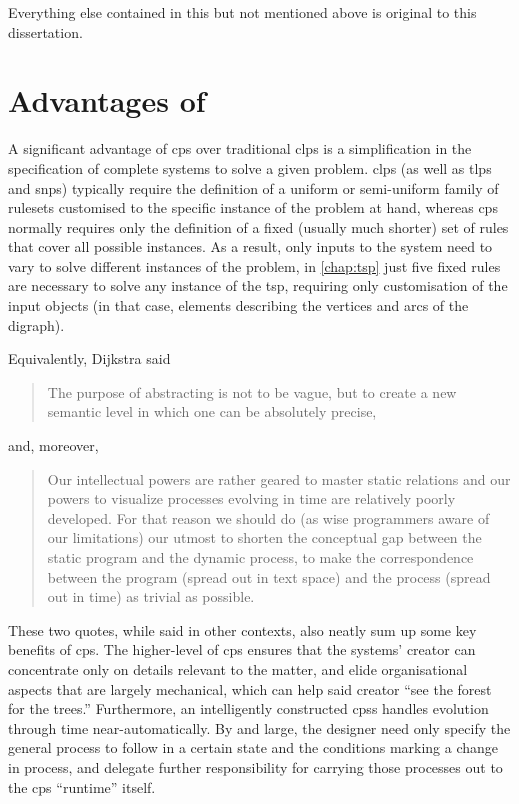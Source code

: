 Everything else contained in this  but not mentioned above is original to this dissertation.


\section{Advantages of }
A significant advantage of \gls{cps} over traditional \gls{clps} is a simplification in the specification of complete systems to solve a given problem.  \Gls{clps} (as well as \gls{tlps} and \gls{snps}) typically require the definition of a uniform or semi-uniform family of \glspl{ruleset} customised to the specific instance of the problem at hand, whereas \gls{cps} normally requires only the definition of a fixed (usually much shorter) set of rules that cover all possible instances. As a result, only inputs to the system need to vary to solve different instances of the problem, \eg{} in \cref{chap:tsp} just five fixed rules are necessary to solve any instance of the \gls{tsp}, requiring only customisation of the input objects (in that case, elements describing the vertices and arcs of the digraph).

Equivalently, Dijkstra \cite{DijkstraWikiquote} said \blockquote{The purpose of abstracting is not to be vague, but to create a new semantic level in which one can be absolutely precise,} and, moreover, \blockquote{Our intellectual powers are rather geared to master static relations and \textelp{} our powers to visualize processes evolving in time are relatively poorly developed. For that reason we should do (as wise programmers aware of our limitations) our utmost to shorten the conceptual gap between the static program and the dynamic process, to make the correspondence between the program (spread out in text space) and the process (spread out in time) as trivial as possible.}.  These two quotes, while said in other contexts, also neatly sum up some key benefits of \gls{cps}.  The higher-level of \gls{cps} ensures that the systems' creator can concentrate only on details relevant to the matter, and elide organisational aspects that are largely mechanical, which can help said creator \enquote{see the forest for the trees.}  Furthermore, an intelligently constructed \glspl{cps} handles evolution through time near-automatically.  By and large, the designer need only specify the general process to follow in a certain state and the conditions marking a change in process, and delegate further responsibility for carrying those processes out to the \gls{cps} ``runtime'' itself.

